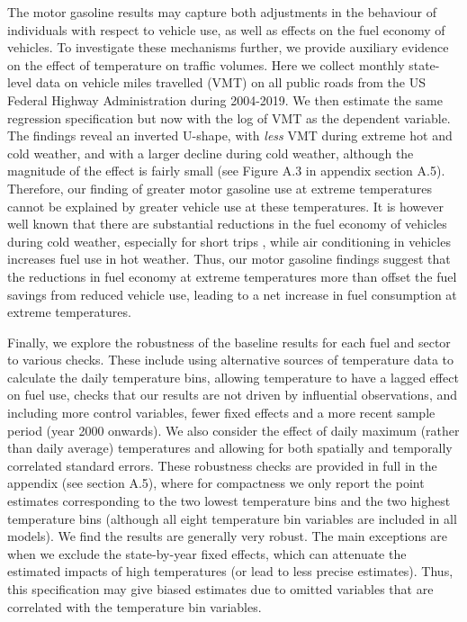 \documentclass[11pt]{article}
\begin{document}
The motor gasoline results may capture both adjustments in the behaviour of individuals with respect to vehicle use, as well as effects on the fuel economy of vehicles. To investigate these mechanisms further, we provide auxiliary evidence on the effect of temperature on traffic volumes. Here we collect monthly state-level data on vehicle miles travelled (VMT) on all public roads from the US Federal Highway Administration during 2004-2019. We then estimate the same regression specification but now with the log of VMT as the dependent variable. The findings reveal an inverted U-shape, with \textit{less} VMT during extreme hot and cold weather, and with a larger decline during cold weather, although the magnitude of the effect is fairly small (see Figure A.3 in appendix section A.5). Therefore, our finding of greater motor gasoline use at extreme temperatures cannot be explained by greater vehicle use at these temperatures. It is however well known that there are substantial reductions in the fuel economy of vehicles during cold weather, especially for short trips \citep{USDOEb}, while air conditioning in vehicles increases fuel use in hot weather. Thus, our motor gasoline findings suggest that the reductions in fuel economy at extreme temperatures more than offset the fuel savings from reduced vehicle use, leading to a net increase in fuel consumption at extreme temperatures. 

Finally, we explore the robustness of the baseline results for each fuel and sector to various checks. These include using alternative sources of temperature data to calculate the daily temperature bins, allowing temperature to have a lagged effect on fuel use, checks that our results are not driven by influential observations, and including more control variables, fewer fixed effects and a more recent sample period (year 2000 onwards). We also consider the effect of daily maximum (rather than daily average) temperatures and allowing for both spatially and temporally correlated standard errors. These robustness checks are provided in full in the appendix (see section A.5), where for compactness we only report the point estimates corresponding to the two lowest temperature bins and the two highest temperature bins (although all eight temperature bin variables are included in all models). We find the results are generally very robust. The main exceptions are when we exclude the state-by-year fixed effects, which can attenuate the estimated impacts of high temperatures (or lead to less precise estimates). Thus, this specification may give biased estimates due to omitted variables that are correlated with the temperature bin variables.
\end{document}
